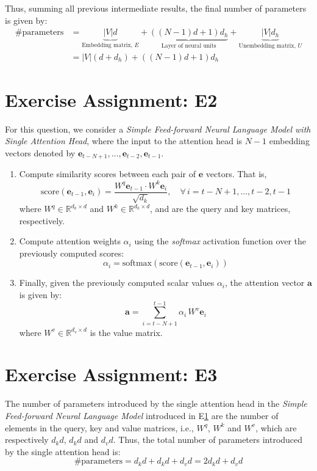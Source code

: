 \documentclass{article}
\begin{document}
Thus, summing all previous intermediate results, the final number of parameters is given by:
\begin{align*}
    \text{\# parameters} & = \underbrace{|V|d}_{\text{Embedding matrix, }E} + \underbrace{\left((N - 1)d + 1\right)d_h}_{\text{Layer of neural units}} + \underbrace{|V|d_h}_{\text{Unembedding matrix, }U} \\
                         & = \left|V\right| (d + d_h) + \left((N - 1)d + 1\right)d_h
\end{align*}

\section{Exercise Assignment: E2}\label{sec:e2}
For this question, we consider a \textit{Simple Feed-forward Neural Language Model with Single Attention Head}, where the input to the attention head is \( N - 1 \) embedding vectors denoted by \( \mathbf{e}_{t-N+1}, \ldots, \mathbf{e}_{t-2}, \mathbf{e}_{t-1} \).

\begin{enumerate}
    \item Compute similarity scores between each pair of $\mathbf{e}$ vectors. That is,
          \[
              \text{score}(\mathbf{e}_{t-1}, \mathbf{e}_i) = \frac{W^q \mathbf{e}_{t-1} \cdot W^k \mathbf{e}_i}{\sqrt{d_k}}, \quad \forall \, i = t - N + 1, \ldots, t - 2, t - 1
          \]
          where $W^q \in \mathbb{R}^{d_k \times d}$ and $W^k \in \mathbb{R}^{d_k \times d}$, and are the query and key matrices, respectively.
    \item Compute attention weights $\alpha_i$ using the \textit{softmax} activation function over the previously computed scores:
          \[
              \alpha_i = \text{softmax}(\text{score}(\mathbf{e}_{t-1}, \mathbf{e}_i))
          \]
    \item Finally, given the previously computed scalar values \(\alpha_i\), the attention vector $\mathbf{a}$ is given by:
          \[
              \mathbf{a} = \sum_{i=t-N+1}^{t-1} \alpha_i \, W^v \mathbf{e}_i
          \]
          where $W^v \in \mathbb{R}^{d_v \times d}$ is the value matrix.
\end{enumerate}

\section{Exercise Assignment: E3}\label{sec:e3}
The number of parameters introduced by the single attention head in the \textit{Simple Feed-forward Neural Language Model} introduced in E\ref{sec:e2} are the number of elements in the query, key and value matrices, i.e., $W^q$, $W^k$ and $W^v$, which are respectively $d_kd$, $d_kd$ and $d_vd$. Thus, the total number of parameters introduced by the single attention head is:
\[
    \text{\# parameters} = d_kd + d_kd + d_vd = 2d_kd + d_vd
\]
\end{document}
